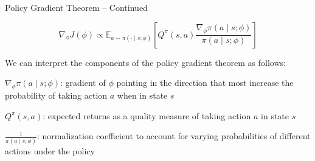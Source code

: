 
\begin{frame}{Policy Gradient Theorem -- Continued}

\begin{intuitionbox}
    \[
        \nabla_{\phi} J(\phi) \propto \mathbb{E}_{a \sim \pi(\cdot \mid s; \phi)} \left[Q^{\pi}(s, a) \frac{\nabla_{\phi} \pi(a \mid s; \phi)}{\pi(a \mid s; \phi)} \right]
    \]
    \vspace{.5em}

    We can interpret the components of the policy gradient theorem as follows:
    \blist
        \item<1->  $\nabla_{\phi} \pi(a \mid s; \phi)$: gradient of $\phi$ pointing in the direction that most increase the probability of taking action $a$ when in state $s$
        \item<2->  $Q^{\pi}(s, a)$: expected returns as a quality measure of taking action $a$ in state $s$
        \item<3-> $\frac{1}{\pi(a \mid s; \phi)}$: normalization coefficient to account for varying probabilities of different actions under the policy
    \elist
\end{intuitionbox}

    
\end{frame}

